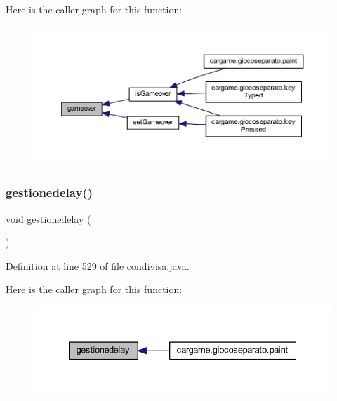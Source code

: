 Here is the caller graph for this function\+:
\nopagebreak
\begin{figure}[H]
\begin{center}
\leavevmode
\includegraphics[width=350pt]{classcargame_1_1condivisa_a66865cebbc04c361135576c98005b741_icgraph}
\end{center}
\end{figure}
\mbox{\label{classcargame_1_1condivisa_a93323c1d8c41c690167fd1b0cea697d5}} 
\subsubsection{\texorpdfstring{gestionedelay()}{gestionedelay()}}
{\footnotesize\ttfamily void gestionedelay (\begin{DoxyParamCaption}{ }\end{DoxyParamCaption})}



Definition at line 529 of file condivisa.\+java.

Here is the caller graph for this function\+:
\nopagebreak
\begin{figure}[H]
\begin{center}
\leavevmode
\includegraphics[width=335pt]{classcargame_1_1condivisa_a93323c1d8c41c690167fd1b0cea697d5_icgraph}
\end{center}
\end{figure}
\mbox{\label{classcargame_1_1condivisa_aa89c1eb296290580066c78298dd31f69}} 
